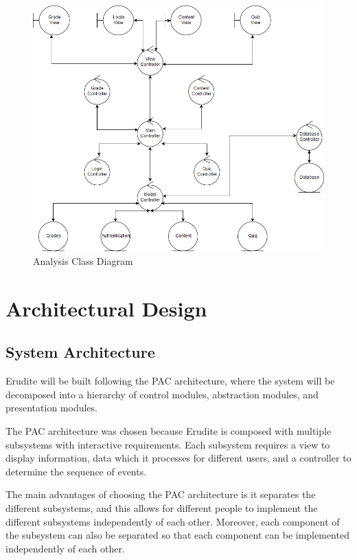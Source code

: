 \documentclass[]{article}
\begin{document}
{
\begin{figure}[h]
  \centering
  \includegraphics[scale=0.5]{A2_Assets/Analysis_Class_Diagrm_v2.jpg}
  \caption{Analysis Class Diagram}
\end{figure}
}


\section{Architectural Design}
\label{sec:architectural_design}




\subsection{System Architecture}
\label{sub:system_architecture}
Erudite will be built following the PAC architecture, where the system will be 
decomposed into a hierarchy of control modules, abstraction modules, and 
presentation modules.

The PAC architecture was chosen because Erudite is composed with multiple 
subsystems with interactive requirements. Each subsystem requires a view to 
display information, data which it processes for different users, and a 
controller to determine the sequence of events.

The main advantages of choosing the PAC architecture is it separates the 
different subsystems, and this allows for different people to implement the 
different subsystems independently of each other. Moreover, each component of 
the subsystem can also be separated so that each component can be implemented 
independently of each other.
\end{document}

